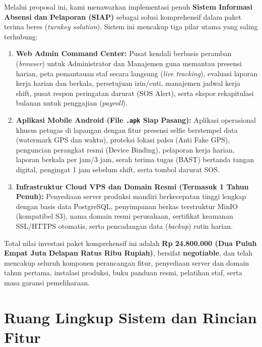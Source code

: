 \documentclass[11pt,a4paper]{article}
\begin{document}
Melalui proposal ini, kami menawarkan implementasi penuh \textbf{Sistem Informasi Absensi dan Pelaporan (SIAP)} sebagai solusi komprehensif dalam paket terima beres (\textit{turnkey solution}). Sistem ini mencakup tiga pilar utama yang saling terhubung:
\begin{enumerate}
    \item \textbf{Web Admin Command Center:} Pusat kendali berbasis peramban (\textit{browser}) untuk Administrator dan Manajemen guna memantau presensi harian, peta pemantauan staf secara langsung (\textit{live tracking}), evaluasi laporan kerja harian dan berkala, persetujuan izin/cuti, manajemen jadwal kerja shift, pusat respon peringatan darurat (SOS Alert), serta ekspor rekapitulasi bulanan untuk penggajian (\textit{payroll}).
    \item \textbf{Aplikasi Mobile Android (File \texttt{.apk} Siap Pasang):} Aplikasi operasional khusus petugas di lapangan dengan fitur presensi selfie berstempel data (watermark GPS dan waktu), proteksi lokasi palsu (Anti Fake GPS), penguncian perangkat resmi (Device Binding), pelaporan kerja harian, laporan berkala per jam/3 jam, serah terima tugas (BAST) bertanda tangan digital, pengingat 1 jam sebelum shift, serta tombol darurat SOS.
    \item \textbf{Infrastruktur Cloud VPS dan Domain Resmi (Termasuk 1 Tahun Penuh):} Penyediaan server produksi mandiri berkecepatan tinggi lengkap dengan basis data PostgreSQL, penyimpanan berkas terstruktur MinIO (kompatibel S3), nama domain resmi perusahaan, sertifikat keamanan SSL/HTTPS otomatis, serta pencadangan data (\textit{backup}) rutin harian.
\end{enumerate}

Total nilai investasi paket komprehensif ini adalah \textbf{Rp 24.800.000 (Dua Puluh Empat Juta Delapan Ratus Ribu Rupiah)}, bersifat \textbf{negotiable}, dan telah mencakup seluruh komponen perancangan fitur, penyediaan server dan domain tahun pertama, instalasi produksi, buku panduan resmi, pelatihan staf, serta masa garansi pemeliharaan.

\section{Ruang Lingkup Sistem dan Rincian Fitur}
\end{document}
